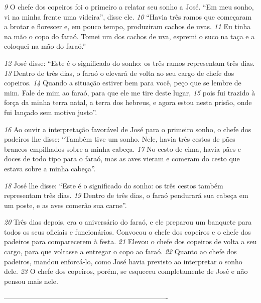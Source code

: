\bigskip
\textit{\tiny 9}
O chefe dos copeiros foi o primeiro a relatar seu sonho a José. “Em meu
sonho, vi na minha frente uma videira”, disse ele. 
\textit{\tiny 10}
“Havia três ramos que
começaram a brotar e florescer e, em pouco tempo, produziram cachos de uvas.
\textit{\tiny 11}
Eu tinha na mão o copo do faraó. Tomei um dos cachos de uva, espremi o suco
na taça e a coloquei na mão do faraó.”
   
\bigskip
\textit{\tiny 12}
José disse: “Este é o significado do sonho: os três ramos representam três
dias. 
\textit{\tiny 13}
Dentro de três dias, o faraó o elevará de volta ao seu cargo de chefe dos
copeiros. 
\textit{\tiny 14}
Quando a situação estiver bem para você, peço que se lembre de mim.
Fale de mim ao faraó, para que ele me tire deste lugar, 
\textit{\tiny 15}
pois fui trazido à força da
minha terra natal, a terra dos hebreus, e agora estou nesta prisão, onde fui lançado
sem motivo justo”.
   
\bigskip
\textit{\tiny 16}
Ao ouvir a interpretação favorável de José para o primeiro sonho, o chefe dos
padeiros lhe disse: “Também tive um sonho. Nele, havia três cestos de pães
brancos empilhados sobre a minha cabeça. 
\textit{\tiny 17}
No cesto de cima, havia pães e
doces de todo tipo para o faraó, mas as aves vieram e comeram do cesto que
estava sobre a minha cabeça”.
   
\bigskip
\textit{\tiny 18}
José lhe disse: “Este é o significado do sonho: os três cestos também
representam três dias. 
\textit{\tiny 19}
Dentro de três dias, o faraó pendurará sua cabeça em um
poste, e as aves comerão sua carne”.
   
\bigskip
\textit{\tiny 20}
Três dias depois, era o aniversário do faraó, e ele preparou um banquete para
todos os seus oficiais e funcionários. Convocou o chefe dos copeiros e o chefe dos
padeiros para comparecerem à festa. 
\textit{\tiny 21}
Elevou o chefe dos copeiros de volta a seu
cargo, para que voltasse a entregar o copo ao faraó. 
\textit{\tiny 22}
Quanto ao chefe dos
padeiros, mandou enforcá-lo, como José havia previsto ao interpretar o sonho
dele. 
\textit{\tiny 23}
O chefe dos copeiros, porém, se esqueceu completamente de José e não
pensou mais nele.

----------------------------------------------------------------------
